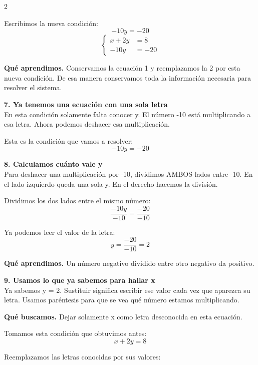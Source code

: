 \documentclass[11pt,a4paper,landscape]{article}
\begin{document}
\begin{multicols*}{2}
\begin{minipage}{\linewidth}
\par\smallskip Escribimos la nueva condición:
\[-10y = -20\]
\[\left\{\begin{aligned}x + 2y &= 8\\-10y &= -20\end{aligned}\right.\]
\par\smallskip\textbf{Qué aprendimos.} Conservamos la ecuación 1 y reemplazamos la 2 por esta nueva condición. De esa manera conservamos toda la información necesaria para resolver el sistema.
\end{minipage}\par\medskip
\noindent\begin{minipage}{\linewidth}\textbf{7. Ya tenemos una ecuación con una sola letra}\\[2pt]En esta condición solamente falta conocer y. El número -10 está multiplicando a esa letra. Ahora podemos deshacer esa multiplicación.
\par\smallskip Esta es la condición que vamos a resolver:
\[-10y = -20\]
\end{minipage}\par\medskip
\noindent\begin{minipage}{\linewidth}\textbf{8. Calculamos cuánto vale y}\\[2pt]Para deshacer una multiplicación por -10, dividimos AMBOS lados entre -10. En el lado izquierdo queda una sola y. En el derecho hacemos la división.
\par\smallskip Dividimos los dos lados entre el mismo número:
\[\frac{-10y}{-10}=\frac{-20}{-10}\]
\par\smallskip Ya podemos leer el valor de la letra:
\[y=\frac{-20}{-10}=2\]
\par\smallskip\textbf{Qué aprendimos.} Un número negativo dividido entre otro negativo da positivo.
\end{minipage}\par\medskip
\noindent\begin{minipage}{\linewidth}\textbf{9. Usamos lo que ya sabemos para hallar x}\\[2pt]Ya sabemos y = 2. Sustituir significa escribir ese valor cada vez que aparezca su letra. Usamos paréntesis para que se vea qué número estamos multiplicando.
\par\smallskip\textbf{Qué buscamos.} Dejar solamente x como letra desconocida en esta ecuación.
\par\smallskip Tomamos esta condición que obtuvimos antes:
\[x + 2y = 8\]
\par\smallskip Reemplazamos las letras conocidas por sus valores:

\end{minipage}
\end{multicols*}
\end{document}
